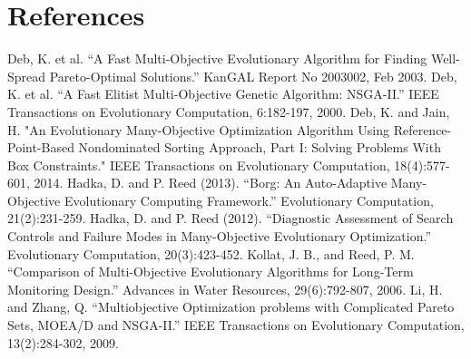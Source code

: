 %
%

\chapter{References}
\label{chpt:references}

Deb, K. et al. ``A Fast Multi-Objective Evolutionary Algorithm for Finding Well-Spread Pareto-Optimal Solutions.'' KanGAL Report No 2003002, Feb 2003. 
\newline
\newline
\noindent
Deb, K. et al.  ``A Fast Elitist Multi-Objective Genetic Algorithm: NSGA-II.''  IEEE Transactions on Evolutionary Computation, 6:182-197, 2000.
\newline
\newline
\noindent
Deb, K. and Jain, H.  "An Evolutionary Many-Objective Optimization Algorithm Using Reference-Point-Based Nondominated Sorting Approach, Part I: Solving Problems With Box Constraints."  IEEE Transactions on Evolutionary Computation, 18(4):577-601, 2014.
\newline
\newline
\noindent
Hadka, D. and P. Reed (2013). ``Borg: An Auto-Adaptive Many-Objective Evolutionary Computing Framework.'' Evolutionary Computation, 21(2):231-259.
\newline
\newline
\noindent
Hadka, D. and P. Reed (2012). ``Diagnostic Assessment of Search Controls and Failure Modes in Many-Objective Evolutionary Optimization.'' Evolutionary Computation, 20(3):423-452.
\newline
\newline
\noindent
Kollat, J. B., and Reed, P. M. ``Comparison of Multi-Objective Evolutionary Algorithms for Long-Term Monitoring Design.''  Advances in Water Resources, 29(6):792-807, 2006.
\newline
\newline
\noindent
Li, H. and Zhang, Q.  ``Multiobjective Optimization problems with Complicated Pareto Sets, MOEA/D and NSGA-II.''  IEEE Transactions on Evolutionary Computation, 13(2):284-302, 2009.
